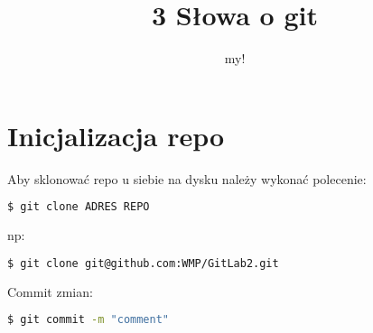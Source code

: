 ﻿\documentclass[12pt,a4paper]{report}
\author{my!}
\title{3 Słowa o git}
\begin{document}
\maketitle

\chapter{Inicjalizacja repo}
Aby sklonować repo u siebie na dysku należy wykonać polecenie:
\begin{lstlisting}[language=bash]
  $ git clone ADRES REPO
\end{lstlisting}
np:
\begin{lstlisting}[language=bash]
  $ git clone git@github.com:WMP/GitLab2.git
\end{lstlisting}

Commit zmian:
\begin{lstlisting}[language=bash]
  $ git commit -m "comment"
\end{lstlisting}
\end{document}
